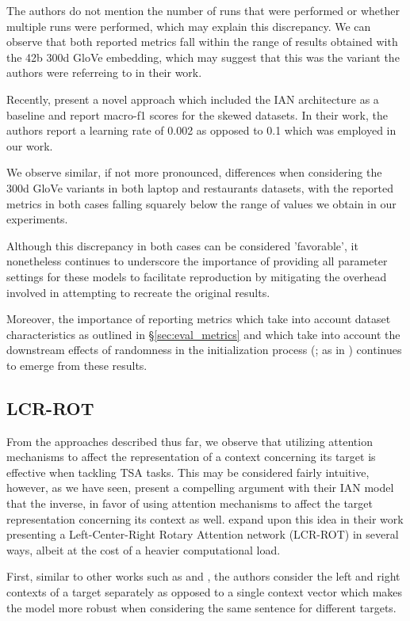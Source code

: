 \documentclass[../../fyp.tex]{subfiles}
\begin{document}
The authors do not mention the number of runs that were performed or whether multiple runs were performed, which may explain this discrepancy. We can observe that both reported metrics fall within the range of results obtained with the 42b 300d GloVe embedding, which may suggest that this was the variant the authors were referreing to in their work. 

Recently, \citet{navonil2020} present a novel approach which included the IAN architecture as a baseline and report macro-f1 scores for the skewed datasets. In their work, the authors report a learning rate of 0.002 as opposed to 0.1 which was employed in our work. 

We observe similar, if not more pronounced, differences when considering the 300d GloVe variants in both laptop and restaurants datasets, with the reported metrics in both cases falling squarely below the range of values we obtain in our experiments. 

Although this discrepancy in both cases can be considered 'favorable', it nonetheless continues to underscore the importance of providing all parameter settings for these models to facilitate reproduction by mitigating the overhead involved in attempting to recreate the original results. 

Moreover, the importance of reporting metrics which take into account dataset characteristics as outlined in \S\ref{sec:eval_metrics} and which take into account the downstream effects of randomness in the initialization process (\citet{reimers2017}; as in \citet{moore2018}) continues to emerge from these results. 

\subsection{LCR-ROT}
From the approaches described thus far, we observe that utilizing attention mechanisms to affect the representation of a context concerning its target is effective when tackling TSA tasks. This may be considered fairly intuitive, however, as we have seen, \citet{dehongma2017} present a compelling argument with their IAN model that the inverse, in favor of using attention mechanisms to affect the target representation concerning its context as well. \citet{zheng2018} expand upon this idea in their work presenting a Left-Center-Right Rotary Attention network (LCR-ROT) in several ways, albeit at the cost of a heavier computational load. 

First, similar to other works such as \citet{tang2016} and \citet{chen2017}, the authors consider the left and right contexts of a target separately as opposed to a single context vector which makes the model more robust when considering the same sentence for different targets. 
\end{document}

